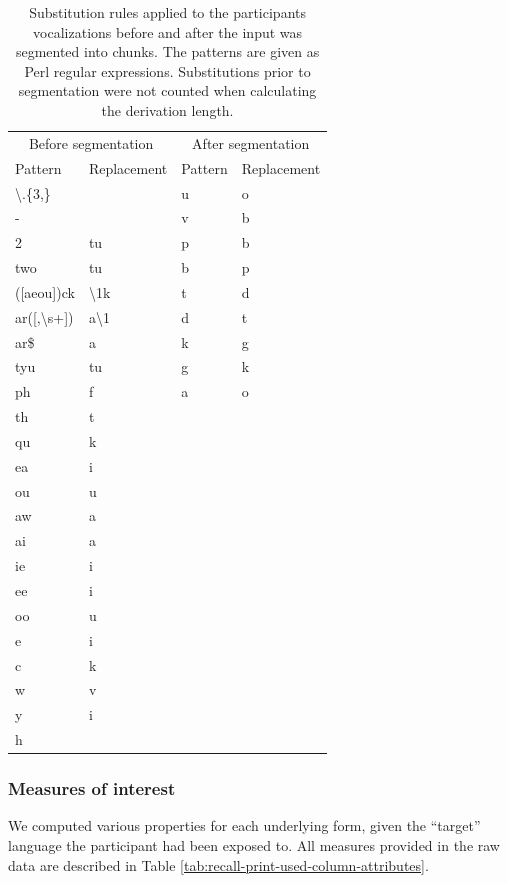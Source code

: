 \documentclass[
]{article}
\begin{document}
\begin{longtable}[t]{llll}
\caption{\label{tab:recall-print-substitution-rules}Substitution rules applied to the participants vocalizations before and after the input was segmented into chunks. The patterns are given as Perl regular expressions. Substitutions prior to segmentation were not counted when calculating the derivation length.}\\
\toprule
\multicolumn{2}{c}{Before segmentation} & \multicolumn{2}{c}{After segmentation} \\
\cmidrule(l{3pt}r{3pt}){1-2} \cmidrule(l{3pt}r{3pt}){3-4}
Pattern & Replacement & Pattern & Replacement\\
\midrule
\textbackslash{}.\{3,\} &  & u & o\\
- &  & v & b\\
2 & tu & p & b\\
two & tu & b & p\\
([aeou])ck & \textbackslash{}1k & t & d\\
\addlinespace
ar([,\textbackslash{}s+]) & a\textbackslash{}1 & d & t\\
ar\$ & a & k & g\\
tyu & tu & g & k\\
ph & f & a & o\\
th & t &  & \\
\addlinespace
qu & k &  & \\
ea & i &  & \\
ou & u &  & \\
aw & a &  & \\
ai & a &  & \\
\addlinespace
ie & i &  & \\
ee & i &  & \\
oo & u &  & \\
e & i &  & \\
c & k &  & \\
\addlinespace
w & v &  & \\
y & i &  & \\
h &  &  & \\
\bottomrule
\end{longtable}

\subsubsection{Measures of interest}\label{measures-of-interest}

We computed various properties for each underlying form, given the
``target'' language the participant had been exposed to. All measures
provided in the raw data are described in Table
\ref{tab:recall-print-used-column-attributes}.
\end{document}
